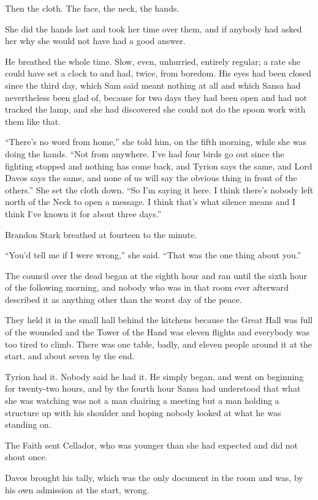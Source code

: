Then the cloth. The face, the neck, the hands.

She did the hands last and took her time over them, and if anybody had asked her why she would not have had a good answer.

He breathed the whole time. Slow, even, unhurried, entirely regular; a rate she could have set a clock to and had, twice, from boredom. His eyes had been closed since the third day, which Sam said meant nothing at all and which Sansa had nevertheless been glad of, because for two days they had been open and had not tracked the lamp, and she had discovered she could not do the spoon work with them like that.

“There’s no word from home,” she told him, on the fifth morning, while she was doing the hands. “Not from anywhere. I’ve had four birds go out since the fighting stopped and nothing has come back, and Tyrion says the same, and Lord Davos says the same, and none of us will say the obvious thing in front of the others.” She set the cloth down. “So I’m saying it here. I think there’s nobody left north of the Neck to open a message. I think that’s what silence means and I think I’ve known it for about three days.”

Brandon Stark breathed at fourteen to the minute.

“You’d tell me if I were wrong,” she said. “That was the one thing about you.”

\sceneBreak

The council over the dead began at the eighth hour and ran until the sixth hour of the following morning, and nobody who was in that room ever afterward described it as anything other than the worst day of the peace.

They held it in the small hall behind the kitchens because the Great Hall was full of the wounded and the Tower of the Hand was eleven flights and everybody was too tired to climb. There was one table, badly, and eleven people around it at the start, and about seven by the end.

Tyrion had it. Nobody said he had it. He simply began, and went on beginning for twenty-two hours, and by the fourth hour Sansa had understood that what she was watching was not a man chairing a meeting but a man holding a structure up with his shoulder and hoping nobody looked at what he was standing on.

The Faith sent Cellador, who was younger than she had expected and did not shout once.

Davos brought his tally, which was the only document in the room and was, by his own admission at the start, wrong.

